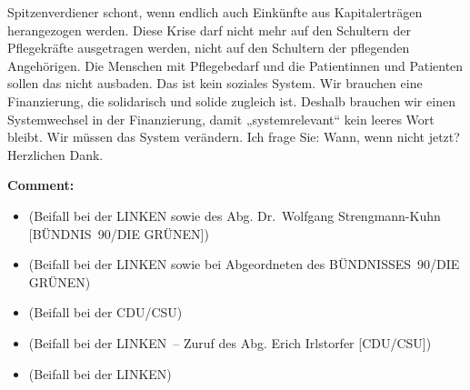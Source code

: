 \documentclass{article}
\begin{document}
Spitzenverdiener schont, wenn endlich auch Einkünfte aus Kapitalerträgen herangezogen werden. Diese Krise darf nicht mehr auf den Schultern der Pflegekräfte ausgetragen werden, nicht auf den Schultern der pflegenden Angehörigen. Die Menschen mit Pflegebedarf und die Patientinnen und Patienten sollen das nicht ausbaden. Das ist kein soziales System. Wir brauchen eine Finanzierung, die solidarisch und solide zugleich ist. Deshalb brauchen wir einen Systemwechsel in der Finanzierung, damit „systemrelevant“ kein leeres Wort bleibt. Wir müssen das System verändern. Ich frage Sie: Wann, wenn nicht jetzt? Herzlichen Dank.  

\noindent\textbf{Comment:}
\begin{itemize}
    \setlength\itemsep{-3pt}
    \item (Beifall bei der LINKEN sowie des Abg. Dr. Wolfgang Strengmann-Kuhn [BÜNDNIS 90/DIE GRÜNEN])
    \setlength\itemsep{-3pt}
    \item (Beifall bei der LINKEN sowie bei Abgeordneten des BÜNDNISSES 90/DIE GRÜNEN)
    \setlength\itemsep{-3pt}
    \item (Beifall bei der CDU/CSU)
    \setlength\itemsep{-3pt}
    \item (Beifall bei der LINKEN – Zuruf des Abg. Erich Irlstorfer [CDU/CSU])
    \setlength\itemsep{-3pt}
    \item (Beifall bei der LINKEN)
\end{itemize}
\end{document}
